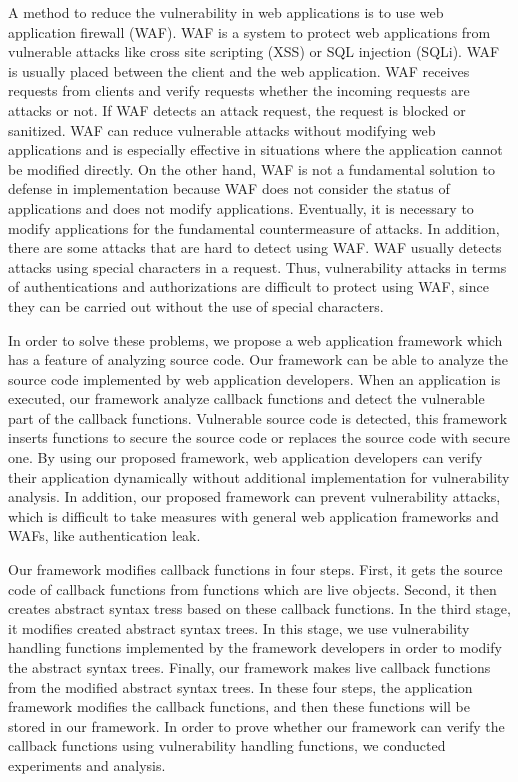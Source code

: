 \documentclass[conference]{IEEEtran}
\begin{document}
A method to reduce the vulnerability in web applications is to use web application firewall (WAF)\cite{kruegel2003anomaly, epp2017anomaly}.
WAF is a system to protect web applications from vulnerable attacks like cross site scripting (XSS) or SQL injection (SQLi).
WAF is usually placed between the client and the web application.
WAF receives requests from clients and verify requests whether the incoming requests are attacks or not.
If WAF detects an attack request, the request is blocked or sanitized.
WAF can reduce vulnerable attacks without modifying web applications and is especially effective in situations where the application cannot be modified directly.
On the other hand, WAF is not a fundamental solution to defense in implementation because WAF does not consider the status of applications and does not modify applications.
Eventually, it is necessary to modify applications for the fundamental countermeasure of attacks.
In addition, there are some attacks that are hard to detect using WAF.
WAF usually detects attacks using special characters in a request.
Thus, vulnerability attacks in terms of authentications and authorizations are difficult to protect using WAF,  since they can be carried out without the use of special characters.

In order to solve these problems, we propose a web application framework which has a feature of analyzing source code.
Our framework can be able to analyze the source code implemented by web application developers.
When an application is executed, our framework analyze callback functions and detect the vulnerable part of the callback functions.
Vulnerable source code is detected, this framework inserts functions to secure the source code or replaces the source code with secure one.
By using our proposed framework, web application developers can verify their application dynamically without additional implementation for vulnerability analysis.
In addition, our proposed framework can prevent vulnerability attacks, which is difficult to take measures with general web application frameworks and WAFs,  like authentication leak.

Our framework modifies callback functions in four steps.
First, it gets the source code of callback functions from functions which are live objects.
Second, it then creates abstract syntax tress based on these callback functions.
In the third stage, it modifies created abstract syntax trees. In this stage, we use vulnerability handling functions implemented by the framework developers in order to modify the abstract syntax trees.
Finally, our framework makes live callback functions from the modified abstract syntax trees.
In these four steps, the application framework modifies the callback functions, and then these functions will be stored in our framework.
In order to prove whether our framework can verify the callback functions using vulnerability handling functions, we conducted experiments and analysis.
\end{document}

